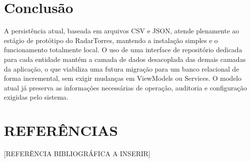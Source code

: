 \section{Conclusão}

A persistência atual, baseada em arquivos CSV e JSON, atende plenamente ao estágio de protótipo
do RadarTorres, mantendo a instalação simples e o funcionamento totalmente local. O uso de uma
interface de repositório dedicada para cada entidade mantém a camada de dados desacoplada das
demais camadas da aplicação, o que viabiliza uma futura migração para um banco relacional de
forma incremental, sem exigir mudanças em ViewModels ou Services. O modelo atual já preserva as
informações necessárias de operação, auditoria e configuração exigidas pelo sistema.

\section*{REFERÊNCIAS}
\small
\raggedright
[REFERÊNCIA BIBLIOGRÁFICA A INSERIR]
